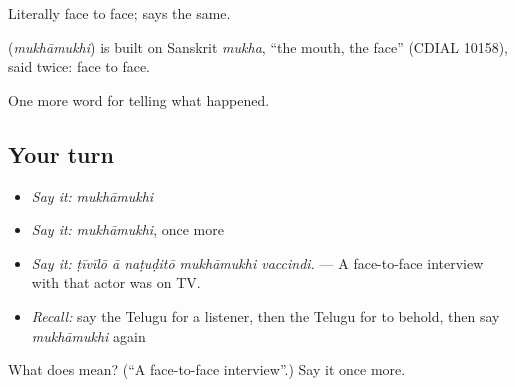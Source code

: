 Literally face to face;  says the same.

\begin{cousinweb}
\textbf{} (\emph{mukhāmukhi}) is built on Sanskrit \emph{mukha}, \textquotedblleft{}the mouth, the face\textquotedblright{} (CDIAL 10158), said twice: face to face.
\end{cousinweb}

\begin{grammarlens}[title={What you've built}]
One more word for telling what happened.
\end{grammarlens}

\subsection*{Your turn}
\begin{itemize}
\raggedright
  \item \emph{Say it:} \emph{mukhāmukhi}
  \item \emph{Say it:} \emph{mukhāmukhi}, once more
  \item \emph{Say it:} \emph{ṭīvīlō ā naṭuḍitō mukhāmukhi vaccindi.} — A face-to-face interview with that actor was on TV.
  \item \emph{Recall:} say the Telugu for a listener, then the Telugu for to behold, then say \emph{mukhāmukhi} again
\end{itemize}

\begin{tcolorbox}[breakable,colback=teal!4,colframe=teal!35!black,title={Before you move on}]
What does  mean? (\textquotedblleft{}A face-to-face interview\textquotedblright{}.) Say it once more.
\end{tcolorbox}
